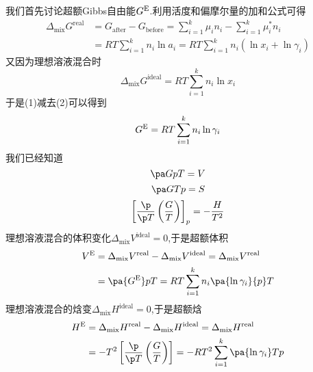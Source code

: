 \documentclass{ctexart}
\begin{document}
\begin{derivation}\setcounter{equation}{0}
    我们首先讨论超额Gibbs自由能$G^\text E$.利用活度和偏摩尔量的加和公式可得
    \begin{equation}
        \begin{aligned}
            \Delta_{\text{mix}}G^{\text{real}}
            &= G_{\text{after}}-G_{\text{before}} = \sum_{i=1}^{k}\mu_in_i-\sum_{i=1}^{k}\mu_i^\ast n_i \\
            &= RT\sum_{i=1}^{k}n_i\ln a_i = RT\sum_{i=1}^{k}n_i\left(\ln x_i+\ln\gamma_i\right)
        \end{aligned}
    \end{equation}
    又因为理想溶液混合时
    \begin{equation}\Delta_{\text{mix}}G^{\text{ideal}}=RT\sum_{i=1}^{k}n_i\ln x_i\end{equation}
    于是(1)减去(2)可以得到
    \begin{equation}G^\text E=RT\sum_{i=1}^{k}n_i\ln\gamma_i\end{equation}
    我们已经知道
    \begin{equation}\pa GpT=V\end{equation}
    \begin{equation}\pa GTp=S\end{equation}
    \begin{equation}
        \left[\dfrac{\p}{\p T}\left(\dfrac{G}{T}\right)\right]_p=-\dfrac{H}{T^2}
    \end{equation}
    理想溶液混合的体积变化$\Delta_{\text{mix}}V^{\text{ideal}}=0$,于是超额体积
    \begin{equation}
        \begin{aligned}
            V^\text E
            &= \Delta_{\text{mix}}V^{\text{real}}-\Delta_{\text{mix}}V^{\text{ideal}}=\Delta_{\text{mix}}V^{\text{real}} \\
            &= \pa{G^\text E}pT=RT\sum_{i=1}^{k}n_i\pa{\ln\gamma_i}{p}T
        \end{aligned}
    \end{equation}
    理想溶液混合的焓变$\Delta_{\text{mix}}H^{\text{ideal}}=0$,于是超额焓
    \begin{equation}
        \begin{aligned}
            H^\text E
            &= \Delta_{\text{mix}}H^{\text{real}}-\Delta_{\text{mix}}H^{\text{ideal}}=\Delta_{\text{mix}}H^{\text{real}} \\
            &= -T^2\left[\dfrac{\p}{\p T}\left(\dfrac GT\right)\right]=-RT^2\sum_{i=1}^{k}\pa{\ln\gamma_i}Tp

\end{aligned}
\end{equation}
\end{derivation}
\end{document}
